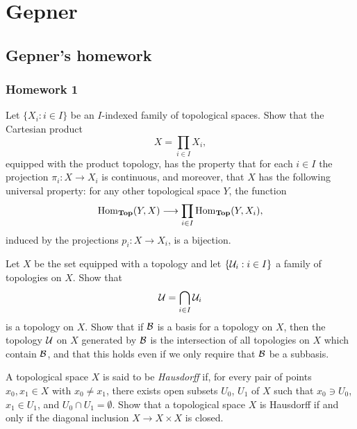 \chapter{Gepner}
\section{Gepner's homework}
\subsection{Homework 1}
\begin{exercise}
  Let \(\{X_i:i\in I\}\) be an \(I\)-indexed family of topological
  spaces. Show that the Cartesian product
  \[
    X=\prod_{i\in I} X_i,
  \]
  equipped with the product topology, has the property that for each
  \(i\in I\) the projection \(\pi_i\colon X\to X_i\) is continuous, and
  moreover, that \(X\) has the following universal property: for any other
  topological space \(Y\), the function
  \[
    \operatorname{Hom}_{\mathbf{Top}}(Y,X)\longrightarrow\prod_{i\in I}\operatorname{Hom}_{\mathbf{Top}}(Y,X_i),
  \]
  induced by the projections \(p_i\colon X\to X_i\), is a bijection.
\end{exercise}
\begin{solution}
\end{solution}

\begin{exercise}
  Let \(X\) be the set equipped with a topology and let \(\{\mathcal{U}_i:i\in
  I\}\) a family of topologies on \(X\). Show that
  \[
    \mathcal{U}=\bigcap_{i\in I}\mathcal{U}_i
  \]
  is a topology on \(X\). Show that if \(\mathcal{B}\) is a basis for a topology
  on \(X\), then the topology \(\mathcal{U}\) on \(X\) generated by \(\mathcal{B}\) is
  the intersection of all topologies on \(X\) which contain \(\mathcal{B}\), and
  that this holds even if we only require that \(\mathcal{B}\) be a subbasis.
\end{exercise}
\begin{solution}
\end{solution}

\begin{exercise}
  A topological space \(X\) is said to be \emph{Hausdorff} if, for every
  pair of points \(x_0,x_1\in X\) with \(x_0\neq x_1\), there exists open
  subsets \(U_0\), \(U_1\) of \(X\) such that \(x_0\ni U_0\),
  \(x_1\in U_1\), and \(U_0\cap U_1=\emptyset\). Show that a topological
  space \(X\) is Hausdorff if and only if the diagonal inclusion
  \(X\to X\times X\) is closed.
\end{exercise}
\begin{solution}
\end{solution}

